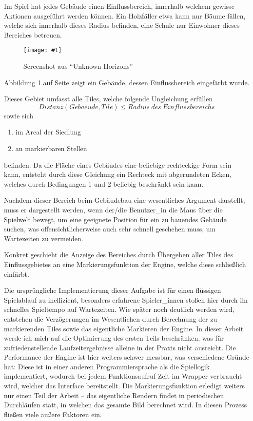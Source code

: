 \documentclass[%
			paper=a4,%
			DIV12,
			liststotoc,
			bibtotoc,
			draft=false,%
			titlepage
			]{scrartcl}
\newcommand{\myfig}[5] {
 \begin{figure}[tbph]
	 \centering
	 \texttt{[image: \#1]}
	 \caption[#4]{#5}
	 \label{fig:#2}
 \end{figure}
}
\begin{document}
Im Spiel hat jedes Gebäude einen Einflussbereich, innerhalb welchem gewisse Aktionen ausgeführt werden können.
Ein Holzfäller etwa kann nur Bäume fällen, welche sich innerhalb dieses Radius befinden,
eine Schule nur Einwohner dieses Bereiches betreuen.
\myfig{img/uh-boatbuilder-overview}{boatbuilder}{width=.8\textwidth}{Screenshot aus "`Unknown Horizons"'}{Screenshot aus "`Unknown Horizons"'}
Abbildung \ref{fig:boatbuilder} auf Seite \pageref{fig:boatbuilder} zeigt ein Gebäude, dessen Einflussbereich eingefärbt wurde.

Dieses Gebiet umfasst alle Tiles, welche folgende Ungleichung erfüllen
\begin{equation}
	Distanz(Gebaeude, Tile) \leq Radius\ des\ Einflussbereichs
\end{equation}
sowie sich
\begin{enumerate}
	\item im Areal der Siedlung 
	\item an markierbaren Stellen
\end{enumerate}
befinden.
Da die Fläche eines Gebäudes eine beliebige rechteckige Form sein kann, entsteht durch diese Gleichung ein Rechteck mit abgerundeten Ecken, welches durch Bedingungen 1 und 2 beliebig beschränkt sein kann.

Nachdem dieser Bereich beim Gebäudebau eine wesentliches Argument darstellt, muss er dargestellt werden, wenn der/die Benutzer\_in die Maus über die Spielwelt bewegt, um eine geeignete Position für ein zu bauendes Gebäude suchen, was offensichtlicherweise auch sehr schnell geschehen muss, um Wartezeiten zu vermeiden.

Konkret geschieht die Anzeige des Bereiches durch Übergeben aller Tiles des Einflussgebietes an eine Markierungsfunktion der Engine, welche diese schließlich einfärbt.

Die ursprüngliche Implementierung dieser Aufgabe ist für einen flüssigen Spielablauf zu ineffizient, besonders erfahrene Spieler\_innen stoßen hier durch ihr schnelles Spieltempo auf Wartezeiten.
Wie später noch deutlich werden wird, entstehen die Verzögerungen im Wesentlichen durch Berechnung der zu markierenden Tiles sowie das eigentliche Markieren der Engine. 
In dieser Arbeit werde ich mich auf die Optimierung des ersten Teils beschränken, was für zufriedenstellende Laufzeitergebnisse alleine in der Praxis nicht ausreicht.
Die Performance der Engine ist hier weiters schwer messbar, was verschiedene Gründe hat:
Diese ist in einer anderen Programmiersprache als die Spiellogik implementiert, wodurch bei jedem Funktionsaufruf Zeit im Wrapper verbraucht wird, welcher das Interface bereitstellt.
Die Markierungsfunktion erledigt weiters nur einen Teil der Arbeit -- das eigentliche Rendern findet in periodischen Durchläufen statt, in welchen das gesamte Bild berechnet wird.
In diesen Prozess fließen viele äußere Faktoren ein. 
\end{document}
